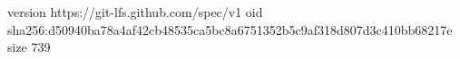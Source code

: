 version https://git-lfs.github.com/spec/v1
oid sha256:d50940ba78a4af42cb48535ca5bc8a6751352b5c9af318d807d3c410bb68217e
size 739
